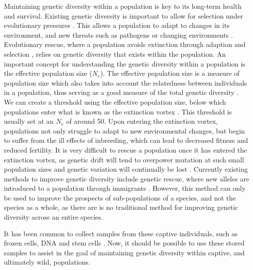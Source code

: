 \documentclass[10pt]{article}
\begin{document}
	Maintaining genetic diversity within a population is key to its long-term health and
	survival. Existing genetic diversity is important to allow for selection under
	evolutionary pressures \citep{harmonConservationSmallPopulations2010}. This allows a population to adapt to changes in its environment,
	and new threats such as pathogens or changing environments
	\citep{mccallumTasmanianDevilFacial2008}. Evolutionary rescue, where a population
	avoids extinction through adaption and selection
	\citep{bellEvolutionaryRescue2017}, relies on genetic diversity that
	exists within the population.
	An important concept for understanding the genetic diversity within a population is the
	effective population size ($N_e$). The effective population size is a measure of
	population size which also takes into account the relatedness between individuals in
	a population, thus serving as a good measure of the total genetic diversity
	\citep{frankhamEffectivePopulationSize1995}. We can
	create a threshold using the effective population size, below which populations enter
	what is known as the extinction vortex \citep{harmonConservationSmallPopulations2010}. This threshold is usually set at an $N_e$ of
	around 50. Upon entering the extinction vortex, populations not only struggle to
	adapt to new environmental changes, but begin to suffer from the ill effects of
	inbreeding, which can lead to decreased fitness and reduced fertility. It is very
	difficult to rescue a population once it has entered the extinction vortex, as genetic
	drift will tend to overpower mutation at such small population sizes and genetic
	variation will continually be lost \citep{harmonConservationSmallPopulations2010}.
	Currently existing methods to improve genetic diversity include genetic rescue,
	where new alleles are introduced to a population through immigrants
	\citep{whiteleyGeneticRescueRescue2015}. However, this method can only be used to
	improve the prospects of sub-populations of a species, and not the species as a
	whole, as there are is no traditional method for improving genetic diversity
	across an entire species.
	
	
	It has been common to collect samples
	from these captive individuals, such as frozen cells, DNA and stem cells \citep{angelesChallengesDevelopmentBiodiversity2022, breithoffArkBankExtinction2020}. Now, it
	should be possible to use these stored samples to assist in the goal of maintaining
	genetic diversity within captive, and ultimately wild, populations.
	
\end{document}
